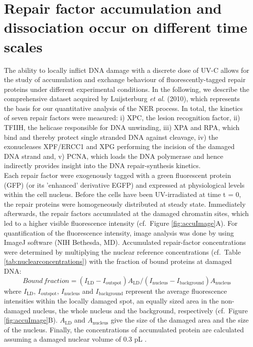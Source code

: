\section{Repair factor accumulation and dissociation occur on different time scales}
\label{subsec:AccuFlipExp}
The ability to locally inflict DNA damage with a discrete dose of UV-C allows for the study of accumulation and exchange behaviour of fluorescently-tagged repair proteins under different experimental conditions. In the following, we describe the comprehensive dataset acquired by Luijsterburg \textit{et al.} (2010)\cite{Luijsterburg2010}, which represents the basis for our quantitative analysis of the NER process. In total, the kinetics of seven repair factors were measured: i) XPC, the lesion recognition factor, ii) TFIIH, the helicase responsible for DNA unwinding, iii) XPA and RPA, which bind and thereby protect single stranded DNA against cleavage, iv) the exonucleases XPF/ERCC1 and XPG performing the incision of the damaged DNA strand and, v) PCNA, which loads the DNA polymerase and hence indirectly provides insight into the DNA repair-synthesis kinetics. \\
Each repair factor were exogenously tagged with a green fluorescent protein (GFP) (or its 'enhanced' derivative EGFP) and expressed at physiological levels within the cell nucleus. Before the cells have been UV-irradiated at time t = 0, the repair proteins were homogeneously distributed at steady state. Immediately afterwards, the repair factors accumulated at the damaged chromatin sites, which led to a higher visible fluorescence intensity (cf.\ Figure \ref{fig:accuImage}A). For quantification of the fluorescence intensity, image analysis was done by using ImageJ software (NIH Bethesda, MD). Accumulated repair-factor concentrations were determined by multiplying the nuclear reference concentrations (cf.\ Table \ref{tab:nuclearconcentrations}) with the fraction of bound proteins at damaged DNA:
%
%
\begin{equation}
Bound \, fraction = (I_\text{LD} - I_\text{outspot})A_\text{LD}/ (I_\text{nucleus} - I_\text{background})A_\text{nucleus}
\label{Eqn:BoundFraction}
\end{equation}     
where $I_\text{LD}$, $I_\text{outspot}$, $I_\text{nucleus}$ and $I_\text{background}$ represent the average fluorescence intensities within the locally damaged spot, an equally sized area in the non-damaged nucleus, the whole nucleus and the background, respectively (cf.\ Figure \ref{fig:accuImage}B). $A_\text{LD}$ and $A_\text{nucleus}$ give the size of the damaged area and the size of the nucleus. Finally, the concentrations of accumulated protein are calculated assuming a damaged nuclear volume of 0.3 pL \cite{Luijsterburg2010}.\\    

